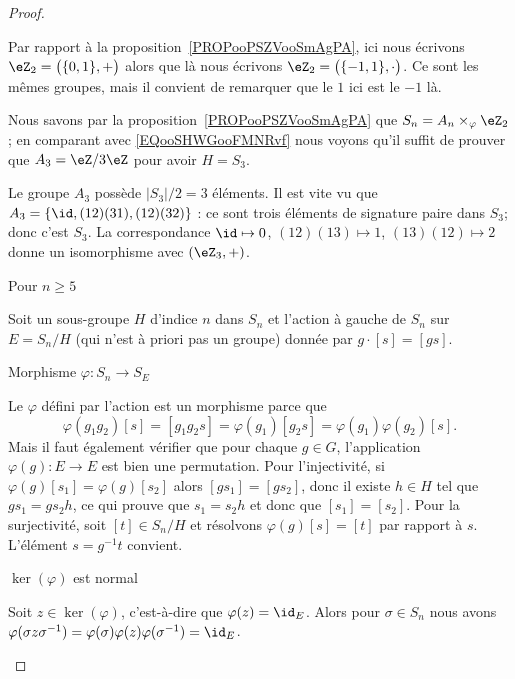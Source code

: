 \begin{proof}
\begin{subproof}
            Par rapport à la proposition~\ref{PROPooPSZVooSmAgPA}, ici nous écrivons \( \eZ_2=\big( \{ 0,1 \},+ \big)\) alors que là nous écrivons \( \eZ_2=\big( \{ -1,1 \},\cdot \big)\). Ce sont les mêmes groupes, mais il convient de remarquer que le \( 1\) ici est le \( -1\) là.

            Nous savons par la proposition~\ref{PROPooPSZVooSmAgPA} que \( S_n=A_n\times_{\varphi}\eZ_2\); en comparant avec \eqref{EQooSHWGooFMNRvf} nous voyons qu'il suffit de prouver que \( A_3=\eZ/3\eZ\) pour avoir \( H=S_3\).

            Le groupe \( A_3\) possède \( | S_3 |/2=3\) éléments. Il est vite vu que \( A_3=\{ \id,(12)(31), (12)(32) \}\) : ce sont trois éléments de signature paire dans \( S_3\); donc c'est \( S_3\). La correspondance \( \id\mapsto 0\), \( (12)(13)\mapsto 1\), \( (13)(12)\mapsto 2\) donne un isomorphisme avec \( (\eZ_3,+)\).

        \item[Pour \( n\geq 5\)]

            Soit un sous-groupe \( H\) d'indice \( n\) dans \( S_n\) et l'action à gauche de \( S_n\) sur \( E=S_n/H\) (qui n'est à priori pas un groupe) donnée par \( g\cdot [s]=[gs]\).

            \begin{subproof}
                \item[Morphisme \( \varphi\colon S_n\to S_E\)]

                    Le \( \varphi\) défini par l'action est un morphisme parce que
                    \begin{equation}
                        \varphi(g_1g_2)[s]=[g_1g_2s]=\varphi(g_1)[g_2s]=\varphi(g_1)\varphi(g_2)[s].
                    \end{equation}
                    Mais il faut également vérifier que pour chaque \( g\in G\), l'application \( \varphi(g)\colon E\to E\) est bien une permutation. Pour l'injectivité, si \( \varphi(g)[s_1]=\varphi(g)[s_2]\) alors \( [gs_1]=[gs_2]\), donc il existe \( h\in H\) tel que \( gs_1=gs_2h\), ce qui prouve que \( s_1=s_2h\) et donc que \( [s_1]=[s_2]\). Pour la surjectivité, soit \( [t]\in S_n/H\) et résolvons \( \varphi(g)[s]=[t]\) par rapport à \( s\). L'élément \( s=g^{-1} t\) convient.

                \item[\( \ker(\varphi)\) est normal]

                    Soit \( z\in\ker(\varphi)\), c'est-à-dire que \( \varphi(z)=\id_E\). Alors pour \( \sigma\in S_n\) nous avons \( \varphi(\sigma z\sigma^{-1})=\varphi(\sigma)\varphi(z)\varphi(\sigma^{-1})=\id_E\).


\end{subproof}
\end{subproof}
\end{proof}
